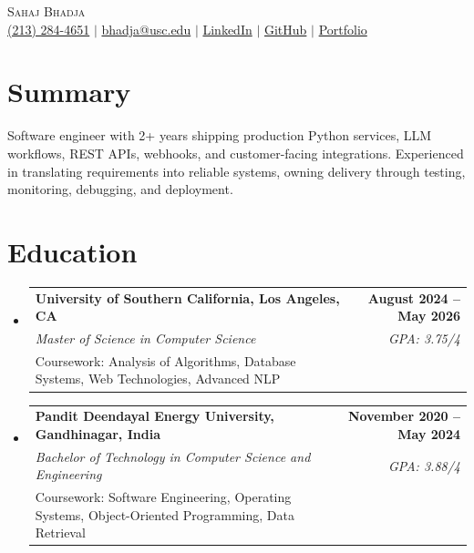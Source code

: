 \documentclass[letterpaper,10pt]{article}
\makeatletter
\newcommand{\resumeEduSubheading}[5]{\vspace{-1pt}\item\begin{tabular*}{1.0\textwidth}[t]{l@{\extracolsep{\fill}}r}\textbf{#1} & \textbf{\small #2} \\\textit{\small #3} & \textit{\small #4} \\\small #5 & \\\end{tabular*}\vspace{-4pt}}
\newcommand{\resumeSubHeadingListStart}{\begin{itemize}[leftmargin=0.0in,label={}]}
\newcommand{\resumeSubHeadingListEnd}{\end{itemize}}
\makeatother
\begin{document}
\begin{center}
  {\Huge \scshape Sahaj Bhadja} \\ \vspace{1pt}
  \small \href{tel:2132844651}{(213) 284-4651} $|$ \href{mailto:bhadja@usc.edu}{bhadja@usc.edu} $|$
  \href{https://www.linkedin.com/in/sahaj-bhadja/}{LinkedIn} $|$ \href{https://github.com/sahaj-bhadja}{GitHub} $|$ \href{https://sahaj-bhadja.github.io/}{Portfolio}
\end{center}
\vspace{-13pt}

\section{Summary}
\small Software engineer with 2+ years shipping production Python services, LLM workflows, REST APIs, webhooks, and customer-facing integrations. Experienced in translating requirements into reliable systems, owning delivery through testing, monitoring, debugging, and deployment.

\section{Education}
\resumeSubHeadingListStart
  \resumeEduSubheading{University of Southern California, Los Angeles, CA}{August 2024 -- May 2026}{Master of Science in Computer Science}{GPA: 3.75/4}{Coursework: Analysis of Algorithms, Database Systems, Web Technologies, Advanced NLP}
  \vspace{2pt}
  \resumeEduSubheading{Pandit Deendayal Energy University, Gandhinagar, India}{November 2020 -- May 2024}{Bachelor of Technology in Computer Science and Engineering}{GPA: 3.88/4}{Coursework: Software Engineering, Operating Systems, Object-Oriented Programming, Data Retrieval}
\resumeSubHeadingListEnd
\end{document}
